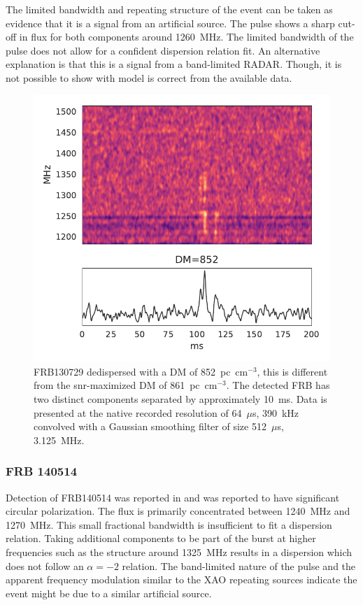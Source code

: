\documentclass[a4paper,fleqn,usenatbib]{mnras}
\begin{document}
The limited bandwidth and repeating structure of the event can be taken as
evidence that it is a signal from an artificial source. The pulse shows a sharp
cut-off in flux for both components around 1260~MHz. The limited bandwidth of
the pulse does not allow for a confident dispersion relation fit. An alternative
explanation is that this is a signal from a band-limited RADAR. Though, it is
not possible to show with model is correct from the available data.

\begin{figure}
    \includegraphics[width=1.0\linewidth]{figures/FRB130729.pdf}
    \caption{FRB130729 dedispersed with a DM of 852~pc~cm$^{-3}$, this is
    different from the \gls{snr}-maximized DM of 861~pc~cm$^{-3}$.  The detected
    FRB has two distinct components separated by approximately 10~ms. Data is
    presented at the native recorded resolution of 64~$\mu$s, 390~kHz convolved
    with a Gaussian smoothing filter of size 512~$\mu$s, 3.125~MHz.
    }
    \label{fig:FRB130729}
\end{figure}

\subsubsection{FRB 140514}

Detection of FRB140514 was reported in \citep{2015MNRAS.447..246P} and was
reported to have significant circular polarization. The flux is primarily
concentrated between 1240~MHz and 1270~MHz. This small fractional bandwidth is
insufficient to fit a dispersion relation. Taking additional components to be
part of the burst at higher frequencies such as the structure around 1325~MHz
results in a dispersion which does not follow an $\alpha=-2$ relation. The
band-limited nature of the pulse and the apparent frequency modulation similar
to the XAO repeating sources indicate the event might be due to a similar
artificial source.
\end{document}
